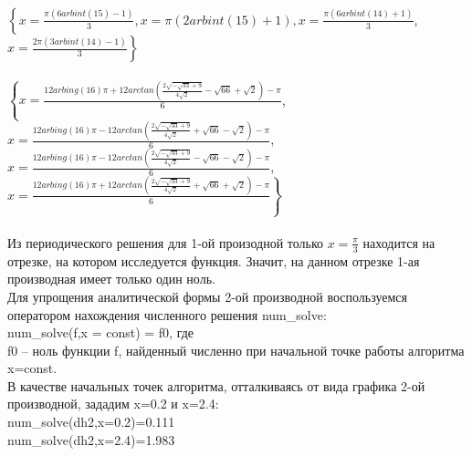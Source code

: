 \documentclass[russian,utf8,nocolumnxxxi,nocolumnxxxii]{eskdtext}
\begin{document}
\\
\newpage
\\
$\left\{x=\frac{\pi(6arbint(15)-1)}{3}, x=\pi(2arbint(15)+1), x=\frac{\pi(6arbint(14)+1)}{3}\right.$,\\ $\left.x=\frac{2\pi(3arbint(14)-1)}{3}\right\}$
\\
\\
$\left\{x=\frac{12arbing(16)\pi+12arctan(\frac{2\sqrt{-\sqrt{33}+9}}{4\sqrt{2}}-\sqrt{66}+\sqrt{2})-\pi}{6}\right.$,\\
$x=\frac{12arbing(16)\pi-12arctan(\frac{2\sqrt{-\sqrt{33}+9}}{4\sqrt{2}}+\sqrt{66}-\sqrt{2})-\pi}{6}$,$x=\frac{12arbing(16)\pi-12arctan(\frac{2\sqrt{-\sqrt{33}+9}}{4\sqrt{2}}-\sqrt{66}-\sqrt{2})-\pi}{6}$,\\
$\left.x=\frac{12arbing(16)\pi+12arctan(\frac{2\sqrt{-\sqrt{33}+9}}{4\sqrt{2}}+\sqrt{66}+\sqrt{2})-\pi}{6}\right\}$\\
\\
Из периодического решения для 1-ой произодной только $x=\frac{\pi}{3}$ находится на отрезке, на котором исследуется функция. Значит, на данном отрезке 1-ая производная имеет только один ноль.\\
Для упрощения аналитической формы 2-ой производной воспользуемся оператором нахождения численного решения num\_solve:\\
num\_solve(f,x = const) = f0, где\\
f0 – ноль функции f, найденный численно при начальной точке работы алгоритма x=const.\\
В качестве начальных точек алгоритма, отталкиваясь от вида графика 2-ой производной, зададим x=0.2 и x=2.4:\\
num\_solve(dh2,x=0.2)=0.111\\
num\_solve(dh2,x=2.4)=1.983\\
\end{document}

